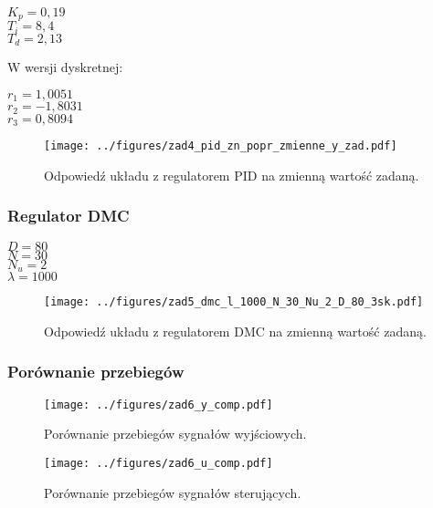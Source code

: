 \documentclass[a4paper,titlepage,11pt,floatssmall]{mwrep}
\begin{document}
\begin{center}
	$K_p = 0,19$ \\
	$T_i = 8,4$ \\
	$T_d = 2,13$ \\
\end{center}

W wersji dyskretnej:

\begin{center}
	$r_1 = 1,0051$ \\  
	$r_2 = -1,8031$ \\ 
	$r_3 = 0,8094$ \\
\end{center}

\begin{figure}[H]
\centering
\texttt{[image: ../figures/zad4\_pid\_zn\_popr\_zmienne\_y\_zad.pdf]}
\caption{Odpowiedź układu z regulatorem PID na zmienną wartość zadaną.}
\end{figure}
\newpage

\subsubsection{Regulator DMC}
\begin{center}
	$D = 80$ \\
	$N = 30$ \\
	$N_u = 2$ \\
	$\lambda = 1000$\\
\end{center}

\bigskip
\begin{figure}[H]
\centering
\texttt{[image: ../figures/zad5\_dmc\_l\_1000\_N\_30\_Nu\_2\_D\_80\_3sk.pdf]}
\caption{Odpowiedź układu z regulatorem DMC na zmienną wartość zadaną.}
\end{figure}


\newpage

\subsubsection{Porównanie przebiegów}
\begin{figure}[H]
\centering
\texttt{[image: ../figures/zad6\_y\_comp.pdf]}
\caption{Porównanie przebiegów sygnałów wyjściowych.}
\end{figure}

\begin{figure}[H]
\centering
\texttt{[image: ../figures/zad6\_u\_comp.pdf]}
\caption{Porównanie przebiegów sygnałów sterujących.}
\end{figure}
\newpage
\end{document}
